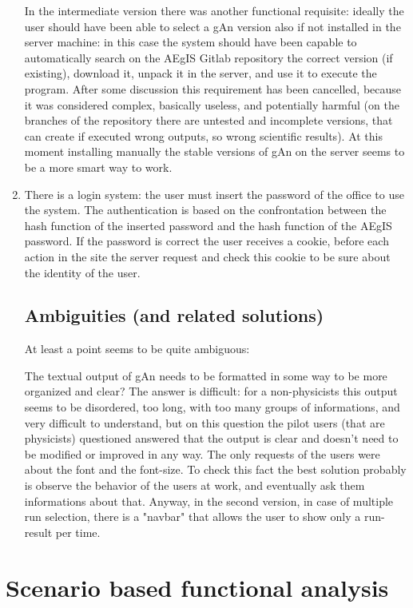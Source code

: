 \begin{enumerate}
In the intermediate version there was another functional requisite: ideally the user should have been able to select a gAn version also if not installed in the server machine: in this case the system should have been capable to automatically search on the AEgIS Gitlab repository the correct version (if existing), download it, unpack it in the server, and use it to execute the program. 
After some discussion this requirement has been cancelled, because it was considered complex, basically useless, and potentially harmful (on the branches of the repository there are untested and incomplete versions, that can create if executed wrong outputs, so wrong scientific results). At this moment installing manually the stable versions of gAn on the server seems to be a more smart way to work.

\item There is a login system: the user must insert the password of the office to use the system. The authentication is based on the confrontation between the hash function of the inserted password and the hash function of the AEgIS password. If the password is correct the user receives a cookie, before each action in the site the server request and check this cookie to be sure about the identity of the user.  


\subsection{Ambiguities (and related solutions)}

At least a point seems to be quite ambiguous: 

The textual output of gAn needs to be formatted in some way to be more organized and clear? 
The answer is difficult: for a non-physicists this output seems to be disordered, too long, with too many groups of informations, and very difficult to understand, but on this question the pilot users (that are physicists) questioned answered that the output is clear and doesn't need to be modified or improved in any way. The only requests of the users were about the font and the font-size. To check this fact the best solution probably is observe the behavior of the users at work, and eventually ask them informations about that.
Anyway, in the second version, in case of multiple run selection, there is a "navbar" that allows the user to show only a run-result per time.

\end{enumerate}


\section{Scenario based functional analysis}

